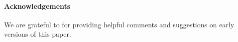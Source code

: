 \paragraph{Acknowledgements}
We are grateful to
\iftoggle{BLIND}{[list of colleagues left out of the anonymised version]}
{James McKinna,
Fredrik Nordvall Forsberg,
Ohad Kammar,
and Jacques Carette}
for providing helpful comments and suggestions on early
versions of this paper.
